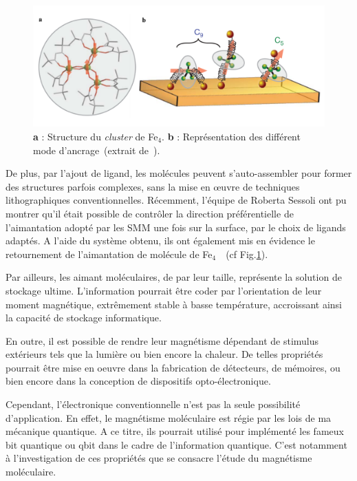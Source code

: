 \begin{figure}
\centering \includegraphics[scale=0.45]{Spintronique/MolecularMag2/MolecularMag2.pdf}
\caption{\textbf{a} : Structure du \textit{cluster} de Fe$_4$. \textbf{b} : Représentation des différent mode d'ancrage~(extrait de~\cite{Mannini2010}).}
\label{MolecularMag2}
\end{figure}

De plus, par l'ajout de ligand, les molécules peuvent s'auto-assembler pour former des structures parfois complexes, sans la mise en œuvre de techniques lithographiques conventionnelles. Récemment, l'équipe de Roberta Sessoli ont pu montrer qu'il était possible de contrôler la direction préférentielle de l'aimantation adopté par les SMM une fois sur la surface, par le choix de ligands adaptés. A l'aide du système obtenu, ils ont également mis en évidence le retournement de l'aimantation de molécule de Fe$_{4}$~\cite{Mannini2010}~(cf Fig.\ref{MolecularMag2}).

Par ailleurs, les aimant moléculaires, de par leur taille, représente la solution de stockage ultime. L'information pourrait être coder par l'orientation de leur moment magnétique, extrêmement stable à basse température, accroissant ainsi la capacité de stockage informatique.

En outre, il est possible de rendre leur magnétisme dépendant de stimulus extérieurs tels que la lumière ou bien encore la chaleur. De telles propriétés pourrait \^etre mise en oeuvre dans la fabrication de détecteurs, de mémoires, ou bien encore dans la conception de dispositifs opto-électronique.

Cependant, l'électronique conventionnelle n'est pas la seule possibilité d'application. En effet, le magnétisme moléculaire est régie par les lois de ma mécanique quantique. A ce titre, ils pourrait utilisé pour implémenté les fameux bit quantique ou qbit dans le cadre de l'information quantique. C'est notamment à l'investigation de ces propriétés que se consacre l'étude du magnétisme moléculaire.
 
